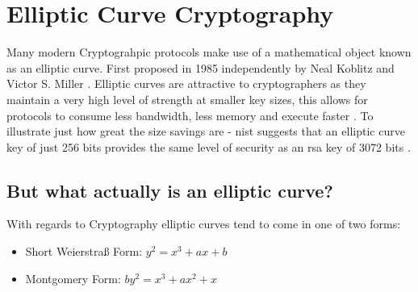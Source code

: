 \clearpage

\section{Elliptic Curve Cryptography}
Many modern Cryptograhpic protocols make use of a mathematical object known as an elliptic curve.
First proposed in 1985 independently by Neal Koblitz \cite{ecc-first-use-koblitz} and Victor S. Miller \cite{ecc-first-use-miller}.
Elliptic curves are attractive to cryptographers as they maintain a very high level of strength at smaller key sizes, this allows for protocols to consume less bandwidth, less memory and execute faster \cite{state-of-ecc}.
To illustrate just how great the size savings are - \gls{nist} suggests that an elliptic curve key of just 256 bits provides the same level of security as an \gls{rsa} key of 3072 bits \cite{nist-ecc-reqs}.

\subsection{But what actually is an elliptic curve?}
With regards to Cryptography elliptic curves tend to come in one of two forms:
\begin{itemize}
  \item Short Weierstra\ss{} Form: $y^2 = x^3 + ax + b$
  \item Montgomery Form: $by^2 = x^3 + ax^2 + x$
\end{itemize}

